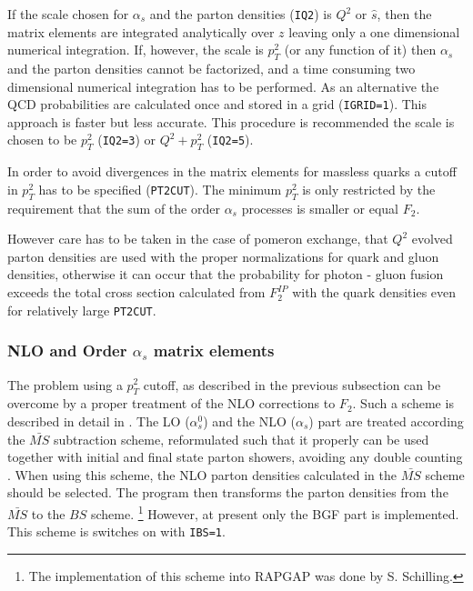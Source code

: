 \documentclass[10pt]{article} \usepackage{dina4}
\newcommand{\PO}{\ensuremath{ I\! \! P} }
\begin{document}
If the scale chosen for $\alpha_s$ and the parton densities (\verb+IQ2+) 
is $Q^2$ or $\hat{s}$, then the matrix elements are integrated 
analytically over $z$ leaving only a one dimensional numerical integration.
If, however, the scale is $p_T^2$ (or any function of it) then $\alpha_s$ and
the parton densities cannot be factorized, and a time consuming 
two dimensional numerical integration has to be performed.
As an alternative the QCD probabilities are calculated once and stored in
a grid (\verb+IGRID=1+).
 This approach is faster but less accurate. This procedure is
recommended the scale is chosen to be $p_T^2$ (\verb+IQ2=3+) or 
$Q^2 + p_T^2$ (\verb+IQ2=5+).
\par
In order to avoid divergences in the matrix elements for massless quarks
a cutoff in $p_T^2$  has to be specified 
(\verb+PT2CUT+). The minimum $p_T^2$ is only restricted by the 
requirement that the sum 
of the order $\alpha_s$ processes is smaller or equal $F_2$. 
\par
 However care has 
to be taken in the case of pomeron exchange, that $Q^2$ evolved 
parton densities are used with the proper normalizations for quark and
gluon densities, otherwise it can occur that the 
probability for photon - gluon fusion exceeds the total cross section 
calculated from $F_2^{\PO}$ with the quark densities even for 
relatively large \verb+PT2CUT+.
\subsubsection{NLO and Order $\alpha_s$ matrix elements }
The problem using a $p_T^2$ cutoff, as described in the previous subsection
can be overcome by a proper treatment of the NLO corrections to $F_2$. Such a
scheme is described in detail in \cite{Collins-collfac,Collins-collfac2}.
The LO ($\alpha_s^0$) and the NLO ($\alpha_s$) part are treated according the
$\bar{MS}$ subtraction scheme, reformulated such that it properly can be used
together with initial and final state parton showers, avoiding any double
counting \cite{sschilling}.
 When using this scheme, the NLO parton densities calculated 
in the $\bar{MS}$ scheme should be selected. The program then transforms the
parton densities from the $\bar{MS}$ to the $BS$ scheme.
\footnote{The implementation of this scheme into RAPGAP was done by S.
Schilling.}  
However, at present only the BGF part is implemented. This scheme is switches on
with \verb+IBS=1+.
\end{document}
